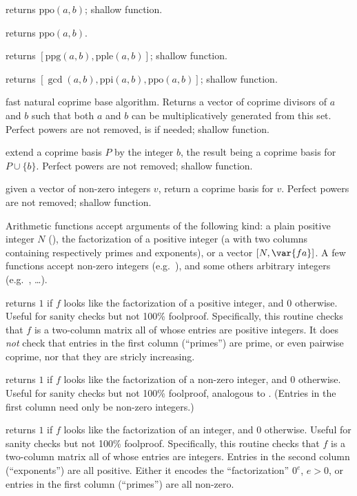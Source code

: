  returns $\text{ppo}(a,b)$; shallow function.

 returns $\text{ppo}(a,b)$.

 returns $[\text{ppg}(a,b), \text{pple}(a,b)]$;
shallow function.

 returns
$[\gcd(a,b), \text{ppi}(a,b), \text{ppo}(a,b)]$; shallow function.

 fast natural coprime base algorithm. Returns a
vector of coprime divisors of $a$ and $b$ such that both $a$ and $b$ can
be multiplicatively generated from this set. Perfect powers are not removed,
is  if needed; shallow function.

 extend a coprime basis $P$ by the
integer $b$, the result being a coprime basis for $P\cup \{b\}$.
Perfect powers are not removed; shallow function.

 given a vector of non-zero integers $v$, return
a coprime basis for $v$. Perfect powers are not removed; shallow function.


Arithmetic functions accept arguments of the following kind: a plain positive
integer $N$ (), the factorization  of a positive integer (a
 with two columns containing respectively primes and exponents), or
a vector $[N,\var{fa}]$. A few functions accept non-zero
integers (e.g.~), and some others arbitrary integers
(e.g.~, \dots).

 returns $1$ if $f$ looks like the
factorization of a positive integer, and $0$ otherwise. Useful for sanity
checks but not 100\% foolproof. Specifically, this routine checks that $f$ is
a two-column matrix all of whose entries are positive integers. It does
\emph{not} check that entries in the first column (``primes'') are prime,
or even pairwise coprime, nor that they are stricly increasing.

 returns $1$ if $f$ looks like the
factorization of a non-zero integer, and $0$ otherwise. Useful for sanity
checks but not 100\% foolproof, analogous to . (Entries
in the first column need only be non-zero integers.)

 returns $1$ if $f$ looks like the
factorization of an integer, and $0$ otherwise. Useful for sanity
checks but not 100\% foolproof. Specifically, this routine checks that $f$ is
a two-column matrix all of whose entries are integers. Entries in the second
column (``exponents'') are all positive. Either it encodes the
``factorization'' $0^e$, $e > 0$, or entries in the first column (``primes'')
are all non-zero.

